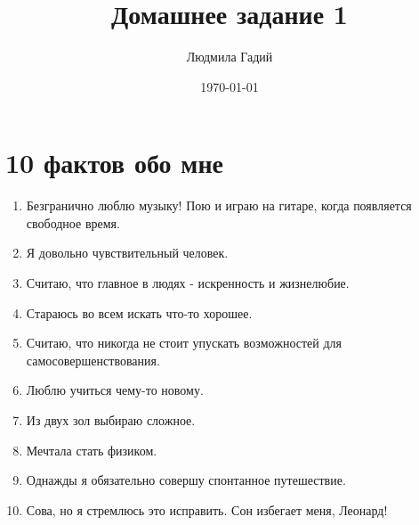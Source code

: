 \documentclass[12pt, a4paper]{article}
\author{Людмила Гадий}
\title{Домашнее задание 1}
\date{\today}
\begin{document}
\maketitle

\section{10 фактов обо мне}
\begin{enumerate}
\item Безгранично люблю музыку! Пою и играю на гитаре, когда появляется свободное время.
\item Я довольно чувствительный человек.
\item Считаю, что главное в людях - искренность и жизнелюбие.
\item Стараюсь во всем искать что-то хорошее.
\item Считаю, что никогда не стоит упускать возможностей для самосовершенствования.
\item Люблю учиться чему-то новому.
\item Из двух зол выбираю сложное.
\item Мечтала стать физиком.
\item Однажды я обязательно совершу спонтанное путешествие.
\item Сова, но я стремлюсь это исправить. Сон избегает меня, Леонард!
\end{enumerate}
\end{document}
